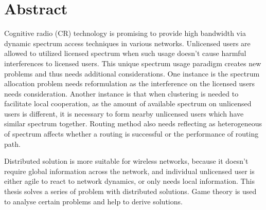\chapter{Abstract}
Cognitive radio (CR) technology is promising to provide high bandwidth via dynamic spectrum access techniques in various networks.
Unlicensed users are allowed to utilized licensed spectrum when such usage doesn't cause harmful interferences to licensed users.
This unique spectrum usage paradigm creates new problems and thus needs additional considerations.
One instance is the spectrum allocation problem needs reformulation as the interference on the licensed users needs consideration.
Another instance is that when clustering is needed to facilitate local cooperation, as the amount of available spectrum on unlicensed users is different, it is necessary to form nearby unlicensed users which have similar spectrum together.
Routing method also needs reflecting as heterogeneous of spectrum affects whether a routing is successful or the performance of routing path.

Distributed solution is more suitable for wireless networks, because it doesn't require global information across the network, and individual unlicensed user is either agile to react to network dynamics, or only needs local information.
This thesis solves a series of problem with distributed solutions.
Game theory is used to analyse certain problems and help to derive solutions.


